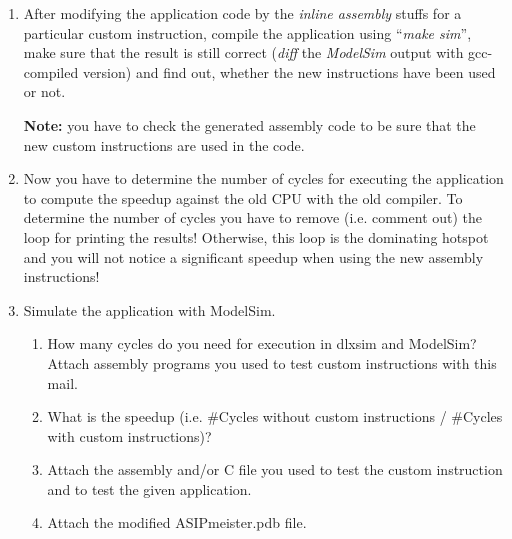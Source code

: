\begin{enumerate}
\begin{enumerate}
		\begin{enumerate}
			\item
			Using \_\_builtin\_brownie32\_\_ABC directive: This method has a
			bug while using with the instruction that has zero return values
			or instructions that return more than one value. Examples:
\begin{lstlisting}
Int a,b,c,d;
c = __builtin_brownie32_AVG(a,b);
d = __builtin_brownie32_SWAP(a);
\end{lstlisting}
			\item	Using \_\_asm\_\_ directive: This can be used for all the cases.
\begin{lstlisting}
Branch Instruction
Int a,b,c,d,e;
__asm__ volatile (
"bgeu %[my_op1], %[my_op2], _here2\n"
"_there2: sub %[my_out], %[my_op1], %[my_op2]\n"
"_here2: add %[my_out], %[my_op1], %[my_op2]\n"
: [my_out] "=&r" (e)
: [my_op1] "r" (a),[my_op2] "r" (b)
);
__asm__ volatile (
"minmax %[my_out1], %[my_out2], %[my_op1], %[my_op2]\n\t"
: [my_out1] "=&r" (c), [my_out2] "=&r" (d)
: [my_op1] "r" (a), [my_op2] "r" (b)
);
\end{lstlisting}
	\end{enumerate}
	\item After modifying the application code by the \emph{inline assembly}
	stuffs for a particular custom instruction, compile the application
	using ``\emph{make sim}'', make sure that the result is still correct
	(\emph{diff} the \emph{ModelSim} output with gcc-compiled version) and
	find out, whether the new instructions have been used or not.

	\textbf{Note:} you have to check the generated assembly code to be sure
	that the new custom instructions are used in the code.
	\item
	Now you have to determine the number of cycles for executing the
	application to compute the speedup against the old CPU with the old
	compiler. {To determine the number of cycles you have to remove (i.e.
		comment out) the loop for printing the results}! Otherwise, this loop
	is the dominating hotspot and you will not notice a significant
	speedup when using the new assembly instructions!
	\item
	Simulate the application with ModelSim.
	\begin{enumerate}[label=(\alph*),start=3]
	\color{red}\item\normalcolor
	How many cycles do you need for execution in dlxsim and ModelSim?
	Attach assembly programs you used to test custom instructions with
	this mail.
	\color{red}\item\normalcolor
	What is the speedup (i.e. \#Cycles without custom instructions /
	\#Cycles with custom instructions)?
	\color{red}\item\normalcolor
	Attach the assembly and/or C file you used to test the custom
	instruction and to test the given application.
	\color{red}\item\normalcolor
	Attach the modified ASIPmeister.pdb file.
	\end{enumerate}
	\end{enumerate}
\end{enumerate}

